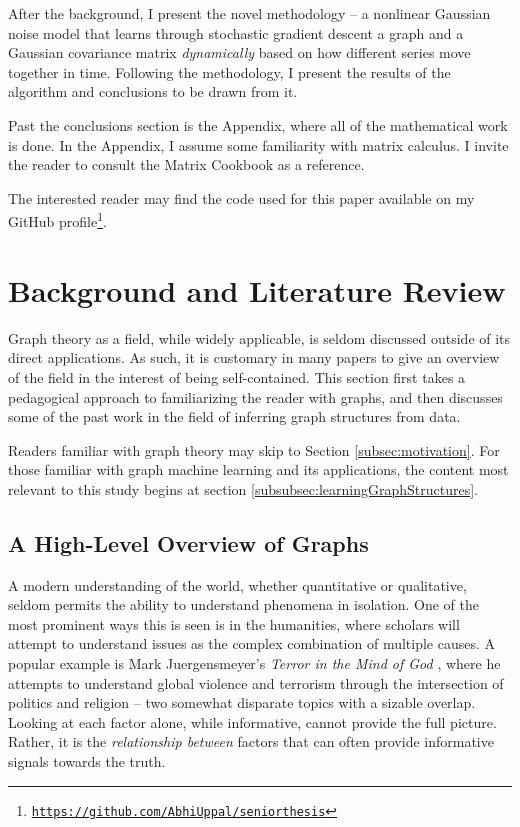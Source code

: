 \documentclass[12pt]{article}
\theoremstyle{definition}
\begin{document}
After the background, I present the novel methodology -- a nonlinear Gaussian noise model that learns through stochastic gradient descent a graph and a Gaussian covariance matrix \textit{dynamically} based on how different series move together in time. Following the methodology, I present the results of the algorithm and conclusions to be drawn from it. 

Past the conclusions section is the Appendix, where all of the mathematical work is done. In the Appendix, I assume some familiarity with matrix calculus. I invite the reader to consult the Matrix Cookbook \cite{matrixCookbook} as a reference.

The interested reader may find the code used for this paper available on my GitHub profile\footnote{\href{https://github.com/AbhiUppal/seniorthesis}{\texttt{https://github.com/AbhiUppal/seniorthesis}}}.

\section{Background and Literature Review}
\label{sec:Background}

Graph theory as a field, while widely applicable, is seldom discussed outside of its direct applications. As such, it is customary in many papers to give an overview of the field in the interest of being self-contained. This section first takes a pedagogical approach to familiarizing the reader with graphs, and then discusses some of the past work in the field of inferring graph structures from data.

Readers familiar with graph theory may skip to Section \ref{subsec:motivation}. For those familiar with graph machine learning and its applications, the content most relevant to this study begins at section \ref{subsubsec:learningGraphStructures}.

\subsection{A High-Level Overview of Graphs}
\label{sec:graphOverview}

A modern understanding of the world, whether quantitative or qualitative, seldom permits the ability to understand phenomena in isolation. One of the most prominent ways this is seen is in the humanities, where scholars will attempt to understand issues as the complex combination of multiple causes. A popular example is Mark Juergensmeyer's \textit{Terror in the Mind of God} \cite{terrorInTheMindOfGod}, where he attempts to understand global violence and terrorism through the intersection of politics and religion -- two somewhat disparate topics with a sizable overlap. Looking at each factor alone, while informative, cannot provide the full picture. Rather, it is the \textit{relationship between} factors that can often provide informative signals towards the truth.
\end{document}
